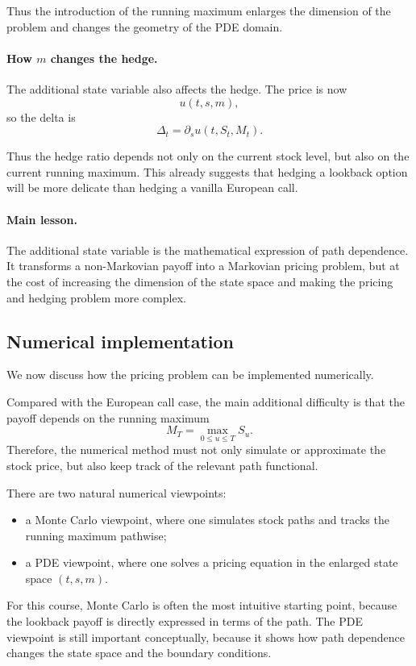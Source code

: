 \documentclass[11pt]{article}
\theoremstyle{plain}
\theoremstyle{definition}
\theoremstyle{remark}
\begin{document}
Thus the introduction of the running maximum enlarges the dimension of
the problem and changes the geometry of the PDE domain.

\paragraph{How \(m\) changes the hedge.}
The additional state variable also affects the hedge.
The price is now
\[
u(t,s,m),
\]
so the delta is
\[
\Delta_t=\partial_s u(t,S_t,M_t).
\]

Thus the hedge ratio depends not only on the current stock level, but
also on the current running maximum.
This already suggests that hedging a lookback option will be more
delicate than hedging a vanilla European call.

\paragraph{Main lesson.}
The additional state variable is the mathematical expression of path
dependence.
It transforms a non-Markovian payoff into a Markovian pricing problem,
but at the cost of increasing the dimension of the state space and
making the pricing and hedging problem more complex.
\subsection{Numerical implementation}

We now discuss how the pricing problem can be implemented numerically.

Compared with the European call case, the main additional difficulty is
that the payoff depends on the running maximum
\[
M_T=\max_{0\le u\le T}S_u.
\]
Therefore, the numerical method must not only simulate or approximate
the stock price, but also keep track of the relevant path functional.

There are two natural numerical viewpoints:
\begin{itemize}[leftmargin=1.4em]
    \item a Monte Carlo viewpoint, where one simulates stock paths and
    tracks the running maximum pathwise;
    \item a PDE viewpoint, where one solves a pricing equation in the
    enlarged state space \((t,s,m)\).
\end{itemize}

For this course, Monte Carlo is often the most intuitive starting point,
because the lookback payoff is directly expressed in terms of the path.
The PDE viewpoint is still important conceptually, because it shows how
path dependence changes the state space and the boundary conditions.
\end{document}

